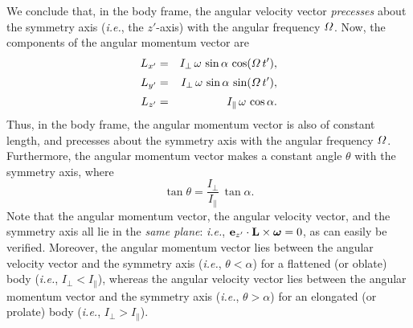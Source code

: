 We conclude that, in the body frame, the angular velocity vector {\em precesses}\/ about the
symmetry axis ({\em i.e.}, the $z'$-axis) with the angular
frequency ${\mit\Omega}$. Now, the components of the angular momentum vector are
\begin{eqnarray}
L_{x'} &=& I_\perp\,\omega\,\sin\alpha\,\cos({\mit\Omega}\,t'),\\[0.5ex]
L_{y'} &=& I_\perp\,\omega\,\sin\alpha\,\sin({\mit\Omega}\,t'),\\[0.5ex]
L_{z'} &=& I_\parallel\,\omega\,\cos\alpha.
\end{eqnarray}
Thus, in the body frame, the angular momentum vector is also of constant length, and
precesses about the symmetry axis with the angular frequency
${\mit\Omega}$. Furthermore, the angular momentum vector makes a constant angle $\theta$ with the symmetry
axis, where
\begin{equation}\label{e9.73a}
\tan\theta = \frac{I_\perp}{I_\parallel}\,\tan\alpha.
\end{equation}
Note that the angular momentum vector, the angular velocity vector, and
the symmetry axis all lie in the {\em same plane}:
{\em i.e.}, ${\bf e}_{z'}\cdot{\bf L}\times \mbox{\boldmath$\omega$}=0$,
as can easily be verified. Moreover, the
angular momentum vector lies between the angular velocity vector and
the symmetry axis ({\em i.e.}, $\theta<\alpha$) for a flattened (or oblate) body
({\em i.e.}, $I_\perp< I_\parallel$), whereas the angular velocity vector lies
between the angular momentum vector and the symmetry axis ({\em i.e.}, $\theta>\alpha$) for  an elongated (or prolate) body ({\em i.e.}, $I_\perp>I_\parallel$). 

